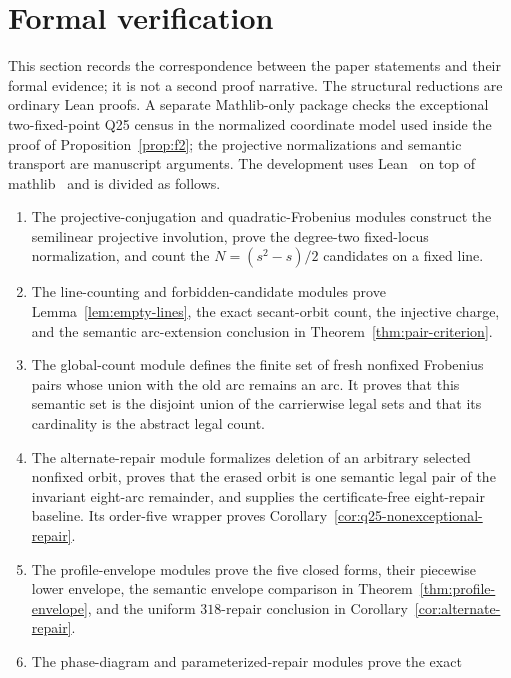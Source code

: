 \section{Formal verification}\label{sec:formalization}

This section records the correspondence between the paper statements and
their formal evidence; it is not a second proof narrative.  The structural
reductions are ordinary Lean proofs.  A separate Mathlib-only package checks
the exceptional two-fixed-point Q25 census in the normalized coordinate model
used inside the proof of Proposition~\ref{prop:f2}; the projective
normalizations and semantic transport are manuscript arguments.  The
development uses Lean~\cite{Lean2015} on top of mathlib~\cite{Mathlib2020}
and is divided as follows.

\begin{enumerate}[leftmargin=2.2em]
\item The projective-conjugation and quadratic-Frobenius modules construct
      the semilinear projective involution, prove the degree-two fixed-locus
      normalization, and count the $N=(s^2-s)/2$ candidates on a fixed line.
\item The line-counting and forbidden-candidate modules prove
      Lemma~\ref{lem:empty-lines}, the exact secant-orbit count, the
      injective charge, and the semantic arc-extension conclusion in
      Theorem~\ref{thm:pair-criterion}.
\item The global-count module defines the finite set of fresh nonfixed
      Frobenius pairs whose union with the old arc remains an arc.  It proves
      that this semantic set is the disjoint union of the carrierwise legal
      sets and that its cardinality is the abstract legal count.
\item The alternate-repair module formalizes deletion of an arbitrary
      selected nonfixed orbit, proves that the erased orbit is one semantic
      legal pair of the invariant eight-arc remainder, and supplies the
      certificate-free eight-repair baseline.  Its order-five wrapper proves
      Corollary~\ref{cor:q25-nonexceptional-repair}.
\item The profile-envelope modules prove the five closed forms, their
      piecewise lower envelope, the semantic envelope comparison in
      Theorem~\ref{thm:profile-envelope}, and the uniform $318$-repair
      conclusion in Corollary~\ref{cor:alternate-repair}.
\item The phase-diagram and parameterized-repair modules prove the exact

\end{enumerate}

